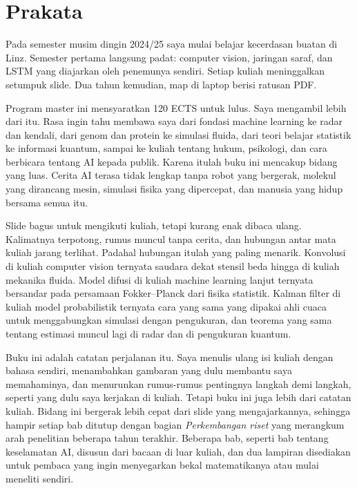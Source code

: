 \chapter*{Prakata}

Pada semester musim dingin 2024/25 saya mulai belajar kecerdasan buatan di Linz. Semester
pertama langsung padat: computer vision, jaringan saraf, dan LSTM yang diajarkan oleh
penemunya sendiri. Setiap kuliah meninggalkan setumpuk slide. Dua tahun kemudian, map di
laptop berisi ratusan PDF.

Program master ini mensyaratkan 120 ECTS untuk lulus. Saya mengambil lebih dari itu. Rasa ingin
tahu membawa saya dari fondasi machine learning ke radar dan kendali, dari genom dan protein ke
simulasi fluida, dari teori belajar statistik ke informasi kuantum, sampai ke kuliah tentang hukum,
psikologi, dan cara berbicara tentang AI kepada publik. Karena itulah buku ini mencakup bidang yang
luas. Cerita AI terasa tidak lengkap tanpa robot yang bergerak, molekul yang dirancang mesin, simulasi
fisika yang dipercepat, dan manusia yang hidup bersama semua itu.

Slide bagus untuk mengikuti kuliah, tetapi kurang enak dibaca ulang. Kalimatnya terpotong,
rumus muncul tanpa cerita, dan hubungan antar mata kuliah jarang terlihat. Padahal hubungan
itulah yang paling menarik. Konvolusi di kuliah computer vision ternyata saudara dekat
stensil beda hingga di kuliah mekanika fluida. Model difusi di kuliah machine learning lanjut
ternyata bersandar pada persamaan Fokker--Planck dari fisika statistik. Kalman filter di kuliah
model probabilistik ternyata cara yang sama yang dipakai ahli cuaca untuk menggabungkan
simulasi dengan pengukuran, dan teorema yang sama tentang estimasi muncul lagi di radar dan di
pengukuran kuantum.

Buku ini adalah catatan perjalanan itu. Saya menulis ulang isi kuliah dengan bahasa sendiri,
menambahkan gambaran yang dulu membantu saya memahaminya, dan menurunkan rumus-rumus pentingnya
langkah demi langkah, seperti yang dulu saya kerjakan di kuliah. Tetapi buku ini juga lebih dari
catatan kuliah. Bidang ini bergerak lebih cepat dari slide yang mengajarkannya, sehingga hampir
setiap bab ditutup dengan bagian \emph{Perkembangan riset} yang merangkum arah penelitian beberapa
tahun terakhir. Beberapa bab, seperti bab tentang keselamatan AI, disusun dari bacaan di luar kuliah,
dan dua lampiran disediakan untuk pembaca yang ingin menyegarkan bekal matematikanya atau mulai
meneliti sendiri.

